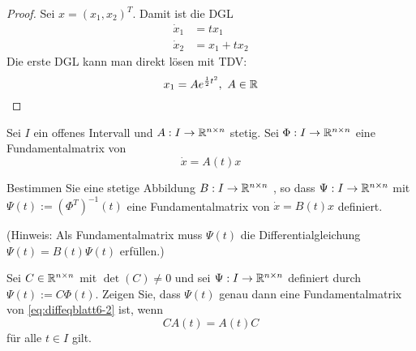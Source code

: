 \begin{proof}
	Sei $x=(x_1,x_2)^T$. Damit ist die DGL
	\begin{align*}
		\dot{x}_1 &= t x_1\\
		\dot{x}_2 &= x_1 + t x_2
	\end{align*}
	Die erste DGL kann man direkt l\"{o}sen mit TDV:
	\[x_1 = Ae^{\frac 12 t^2},~A\in \mathbb{R}\]
\end{proof}
\begin{Problem}
	Sei $I$ ein offenes Intervall und $A: I\to \mathbb{R}^{n\times n}$ stetig. Sei $\Phi: I\to \mathbb{R}^{n\times n}$ eine Fundamentalmatrix von 
	\begin{equation}\label{eq:diffeqblatt6-2}
		\dot{x}=A(t)x
	\end{equation}
	\begin{parts}
		\item Bestimmen Sie eine stetige Abbildung $B : I \to \mathbb{R}^{n\times n}$ , so dass $\Psi : I \to \mathbb{R}^{n\times n}$ mit $\Psi(t) := (\Phi^T)^{-1}(t)$ eine Fundamentalmatrix von $\dot{x} = B(t)x$ definiert.
			
			(Hinweis: Als Fundamentalmatrix muss $\Psi(t)$ die Differentialgleichung $\Psi(t) = B(t)\Psi(t)$ erfüllen.)
			\item Sei $C \in \mathbb{R}^{n\times n}$ mit $\det(C) \neq 0$ und sei $\Psi : I \to \mathbb{R}^{n\times n}$ definiert durch $\Psi(t) := C\Phi(t)$. Zeigen Sie, dass $\Psi(t)$ genau dann eine Fundamentalmatrix von \eqref{eq:diffeqblatt6-2} ist, wenn
			\[CA(t)=A(t)C\]
			f\"{u}r alle $t\in I$ gilt.
	\end{parts}
\end{Problem}

